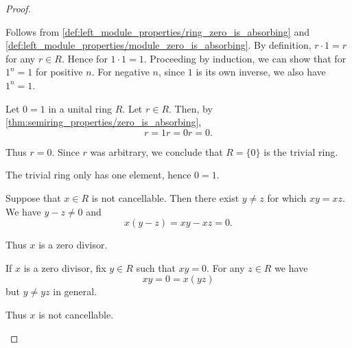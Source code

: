 \begin{proof}\mbox{}
  \begin{itemize}
     Follows from \cref{def:left_module_properties/ring_zero_is_absorbing} and \cref{def:left_module_properties/module_zero_is_absorbing}.
     By definition, \( r \cdot 1 = r \) for any \( r \in R \). Hence for \( 1 \cdot 1 = 1 \). Proceeding by induction, we can show that for \( 1^n = 1 \) for positive \( n \). For negative \( n \), since \( 1 \) is its own inverse, we also have \( 1^n = 1 \).

    \mbox{}
    \begin{description}
      \Implies Let \( 0 = 1 \) in a unital ring \( R \). Let \( r \in R \). Then, by \cref{thm:semiring_properties/zero_is_absorbing},
      \begin{equation*}
        r = 1r = 0r = 0.
      \end{equation*}

      Thus \( r = 0 \). Since \( r \) was arbitrary, we conclude that \( R = \{ 0 \} \) is the trivial ring.

      \ImpliedBy The trivial ring only has one element, hence \( 0 = 1 \).
    \end{description}

    \mbox{}
    \begin{description}
      \Implies Suppose that \( x \in R \) is not cancellable. Then there exist \( y \neq z \) for which \( xy = xz \). We have \( y - z \neq 0 \) and
      \begin{equation*}
        x(y - z) = xy - xz = 0.
      \end{equation*}

      Thus \( x \) is a zero divisor.

      \ImpliedBy If \( x \) is a zero divisor, fix \( y \in R \) such that \( xy = 0 \). For any \( z \in R \) we have
      \begin{equation*}
        xy = 0 = x(yz)
      \end{equation*}
      but \( y \neq yz \) in general.

      Thus \( x \) is not cancellable.
    \end{description}
  \end{itemize}
\end{proof}

